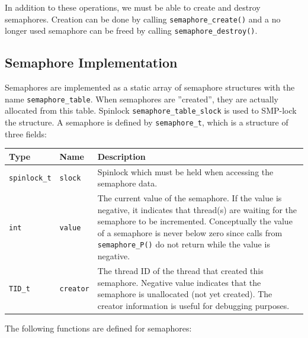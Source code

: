 \documentclass[twoside,a4paper]{report}
\newcommand{\PBS}[1]{\let\temp=\\#1\let\\=\temp}
\newlength{\tablewidth}
\begin{document}
In addition to these operations, we must be able to create and destroy
semaphores. Creation can be done by calling
\texttt{semaphore\_create()} and a no longer used semaphore can be
freed by calling \texttt{semaphore\_destroy()}.

\subsection{Semaphore Implementation}


Semaphores are implemented as a static array of semaphore structures
with the name
\texttt{semaphore\_table}.
When semaphores are ''created'', they are actually allocated from this
table. Spinlock \texttt{semaphore\_table\_slock}
 is
used to SMP-lock the structure. A semaphore is defined by
\texttt{semaphore\_t}, which
is a structure of three fields:

\begin{center}
\begin{tabularx}{\tablewidth}{l|l|>{\PBS\raggedright}X}
\textbf{Type}   & \textbf{Name}    & \textbf{Description} \\
\hline

\texttt{spinlock\_t} & \texttt{slock} & Spinlock which must be held
when accessing the semaphore data.\\

\hline

\texttt{int} & \texttt{value} & The current value of the semaphore. If
the value is negative, it indicates that thread(s) are waiting for the
semaphore to be incremented. Conceptually the value of a semaphore is
never below zero since calls from \texttt{semaphore\_P()} do not
return while the value is negative.\\

\hline

\texttt{TID\_t} & \texttt{creator} & The thread ID of the thread that
created this semaphore. Negative value indicates that the semaphore is
unallocated (not yet created). The creator information is useful for
debugging purposes. \\

\end{tabularx}
\end{center}

The following functions are defined for semaphores:
\end{document}
